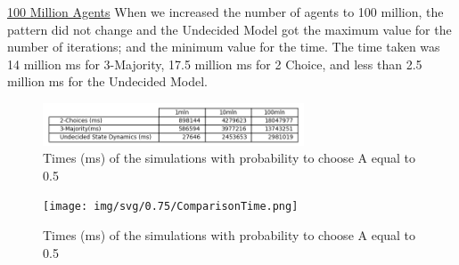 \underline{100 Million Agents}
When we increased the number of agents to 100 million, the pattern did not change and the Undecided Model got the maximum value for the number of iterations; and the minimum value for the time. The time taken was 14 million ms for 3-Majority, 17.5 million ms for 2 Choice, and less than 2.5 million ms for the Undecided Model.

\begin{figure}[H]
    \centering
    \includegraphics[width=0.69\textwidth,height=0.12\textheight]{img/svg/ComparisonTime.png}
    \caption{Times (ms) of the simulations with probability to choose A equal to 0.5}
\end{figure}

\begin{figure}[H]
    \centering
    \texttt{[image: img/svg/0.75/ComparisonTime.png]}
    \caption{Times (ms) of the simulations with probability to choose A equal to 0.5}
\end{figure}